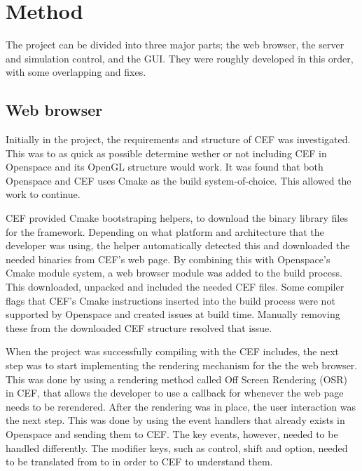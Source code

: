 \chapter{Method}
\label{cha:method}



The project can be divided into three major parts; the web browser, the server and simulation control, and the GUI. They were roughly developed in this order, with some overlapping and fixes.

\section{Web browser}

Initially in the project, the requirements and structure of CEF was investigated. This was to as quick as possible determine wether or not including CEF in Openspace and its OpenGL structure would work. It was found that both Openspace and CEF uses Cmake as the build system-of-choice. This allowed the work to continue.

CEF provided Cmake bootstraping helpers, to download the binary library files for the framework. Depending on what platform and architecture that the developer was using, the helper automatically detected this and downloaded the needed binaries from CEF's web page. By combining this with Openspace's Cmake module system, a web browser module was added to the build process. This downloaded, unpacked and included the needed CEF files. Some compiler flags that CEF's Cmake instructions inserted into the build process were not supported by Openspace and created issues at build time. Manually removing these from the downloaded CEF structure resolved that issue.

When the project was successfully compiling with the CEF includes, the next step was to start implementing the rendering mechanism for the the web browser. This was done by using a rendering method called Off Screen Rendering (OSR) in CEF, that allows the developer to use a callback for whenever the web page needs to be rerendered. After the rendering was in place, the user interaction was the next step. This was done by using the event handlers that already exists in Openspace and sending them to CEF. The key events, however, needed to be handled differently. The modifier keys, such as control, shift and option, needed to be translated from  to  in order to CEF to understand them.

